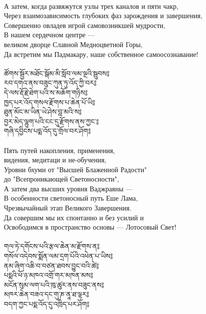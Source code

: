 \\
{\ru
А затем, когда развяжутся узлы трех каналов и пяти чакр,\\
Через взаимозависимость глубоких фаз зарождения и завершения,\\
Совершенно овладев игрой самовозникшей мудрости,\\
В нашем сердечном центре — \\ \indent великом дворце Славной Медноцветной Горы,\\
Да встретим мы Падмакару, наше собственное самоосознавание!}\\
\\
\newpage
{\ti ཚོགས་སྦྱོར་མཐོང་སྒོམ་མི་སློབ་ལམ་ལྔའི་སྦུབས༔\\
རབ་དགའ་ནས་བཟུང་ཀུན་ཏུ་འོད་ཀྱི་བར༔\\
དེ་ལས་རྡོ་རྗེ་ཐེག་པའི་ས་མཆོག་གཉིས༔\\
ཁྱད་པར་འོད་གསལ་རྫོགས་པ་ཆེན་པོ་ཡི༔\\
ཐུན་མོང་མ་ཡིན་ཡེ་ཤེས་བླ་མའི་ས༔\\
བྱར་མེད་ལྷུག་པའི་ངང་དུ་རྫོགས་ནས་ཀྱང་༔\\
གཞི་དབྱིངས་པདྨ་འོད་དུ་གྲོལ་བར་ཤོག༔}\\
\\
\ru
Пять путей накопления, применения, \\ \indent видения, медитаци и не-обучения,\\
Уровни бхуми от "Высшей Блаженной Радости" \\ \indent до "Всепроникающей Светоносности",\\
А затем два высших уровня Ваджраяны —\\
В особенности светоносный путь Еше Лама,\\
Чрезвычайный этап Великого Завершения.\\
Да совершим мы их спонтанно и без усилий и\\
Освободимся в пространство основы — Лотосовый Свет!\\
\\
{\ti གལ་ཏེ་དགོངས་པའི་རྩལ་ཆེན་མ་རྫོགས་ན༔\\
གསོལ་འདེབས་སྨོན་ལམ་དྲག་པོའི་འཕེན་པ་ཡིས༔\\
ནམ་ཞིག་འཆི་བ་བཙན་ཐབས་བྱུང་བའི་ཚེ༔\\
པདྨའི་ཕོ་ཉ་མཁའ་འགྲོ་གར་མཁན་མས༔\\
མངོན་སུམ་ལག་པའི་ཁུ་ཚུར་ནས་བཟུང་ནས༔\\
མཁར་ཆེན་བཟའ་དང་གུ་ཎ་ནཱ་ཐ་ལྟར༔\\
བདག་ཀྱང་པདྨ་འོད་དུ་འཁྲིད་པར་ཤོག༔}\\
\\

